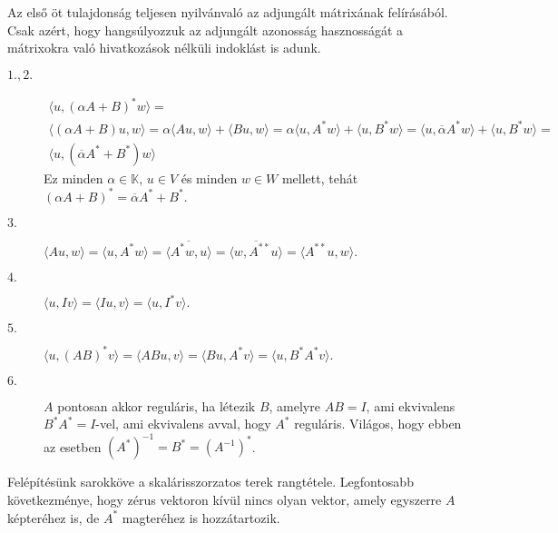 \documentclass[9pt, a4paper, showtrims]{memoir}
\makeatletter
\renewenvironment{proof}[1][\proofname]
    {\par\pushQED{\qed}%
    \normalfont \topsep6\p@\@plus6\p@\relax
    \trivlist
    \item[\hskip\labelsep
        \itshape
    #1\@addpunct{:}]\ignorespaces}
    {\popQED\endtrivlist\@endpefalse}
\theoremstyle{plain}
\theoremstyle{remark}
\theoremstyle{definition}
\newcommand{\ip}[2]{\langle#1,#2\rangle}
\makeatother
\begin{document}
\begin{proof}
	Az első öt tulajdonság teljesen nyilvánvaló az adjungált mátrixának felírásából.
	Csak azért, hogy hangsúlyozzuk az adjungált azonosság hasznosságát a mátrixokra való hivatkozások nélküli indoklást is adunk.
	\begin{description}
		\item[$1., 2.$ ]
		      \begin{multline*}
			      \ip{u}{(\alpha A+B)^\ast w}
			      =\\
			      \ip{\left( \alpha A+B \right)u}{w}
			      =
			      \alpha\ip{Au}{w}+\ip{Bu}{w}
			      =
			      \alpha\ip{u}{A^\ast w}+\ip{u}{B^\ast w}
			      =
			      \ip{u}{\overline{\alpha}A^\ast w}+\ip{u}{B^\ast w}
			      =\\
			      \ip{u}{\left( \overline{\alpha}A^\ast +B^\ast \right)w}
		      \end{multline*}
		      Ez minden $\alpha\in\mathbb{K}$, $u\in V$ és minden $w\in W$ mellett, tehát
		      \begin{math}
			      \left( \alpha A+B \right)^\ast=\overline{\alpha}A^\ast+B^\ast.
		      \end{math}
		\item[$3.$]
		      \(
		      \ip{Au}{w}
		      =
		      \ip{u}{A^\ast w}
		      =
		      \overline{
			      \ip{A^\ast w}{u}
		      }
		      =
		      \overline{
			      \ip{w}{A^{\ast\ast} u}
		      }
		      =
		      \ip{A^{\ast\ast} u}{w}.
		      \)
		\item[$4.$]
		      \(
		      \ip{u}{Iv}
		      =
		      \ip{Iu}{v}
		      =
		      \ip{u}{I^\ast v}.
		      \)
		\item[$5.$]
		      \begin{math}
			      \ip{u}{\left( AB \right)^\ast v}
			      =
			      \ip{ABu}{v}
			      =
			      \ip{Bu}{A^\ast v}
			      =
			      \ip{u}{B^\ast A^\ast v}.
		      \end{math}
		\item[$6.$] $A$ pontosan akkor reguláris, ha létezik $B$, amelyre $AB=I$, ami ekvivalens $B^\ast A^\ast=I$-vel,
		      ami ekvivalens avval, hogy $A^\ast$ reguláris.
		      Világos, hogy ebben az esetben $\left( A^\ast \right)^{-1}=B^\ast=\left( A^{-1} \right)^\ast$.
		      \qedhere
	\end{description}
\end{proof}
Felépítésünk sarokköve a skalárisszorzatos terek rangtétele.
Legfontosabb következménye, hogy zérus vektoron kívül nincs olyan vektor,
amely egyszerre $A$ képteréhez is, de $A^\ast$ magteréhez is hozzátartozik.
\end{document}

